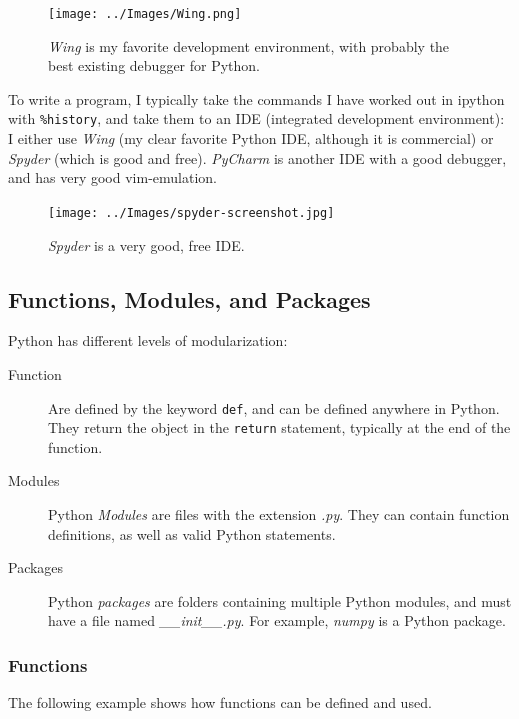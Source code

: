 \begin{figure}
  \centering
  \texttt{[image: ../Images/Wing.png]}\\
  \caption{\emph{Wing} is my favorite development environment, with probably the best existing debugger for Python.}
\end{figure}

To write a program, I typically take the commands I have worked out in ipython with \lstinline{%history}, and take them to an IDE (integrated development environment): I either use \emph{Wing} (my clear favorite Python IDE, although it is commercial) or \emph{Spyder} (which is good and free). \emph{PyCharm} is another IDE with a good debugger, and has very good vim-emulation.

\begin{figure}
  \centering
  \texttt{[image: ../Images/spyder-screenshot.jpg]}\\
  \caption{\emph{Spyder} is a very good, free IDE.}
\end{figure}

\subsection{Functions, Modules, and Packages}

Python has different levels of modularization:

\begin{description}
  \item[Function] Are defined by the keyword \lstinline{def}, and can be defined anywhere in Python. They return the object in the \lstinline{return} statement, typically at the end of the function.
  \item[Modules] Python \emph{Modules} are files with the extension \emph{.py}. They can contain function definitions, as well as valid Python statements.
  \item[Packages] Python \emph{packages} are folders containing multiple Python modules, and must have a file named \emph{\_\_init\_\_.py}. For example, \emph{numpy} is a Python package.
\end{description}

\subsubsection{Functions}
The following example shows how functions can be defined and used.



